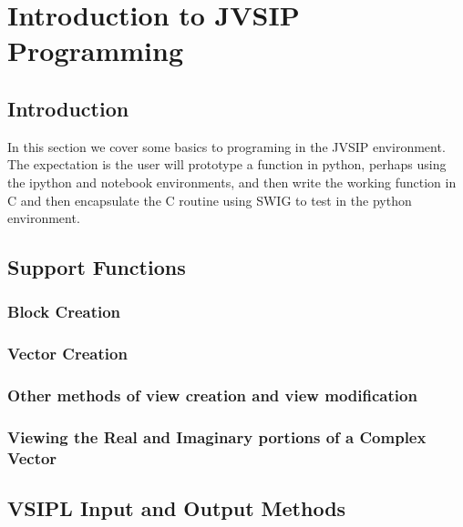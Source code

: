 \chapter{Introduction to JVSIP Programming}
\section*{Introduction}
In this section we cover some basics to programing in the JVSIP environment. The expectation is the user will
prototype a function in python, perhaps using the ipython and notebook environments, and then write the
working function in C and then encapsulate the C routine using SWIG to test in the python environment.
\section*{Support Functions}
\subsection*{Block Creation}
\subsection*{Vector Creation}
\subsection*{Other methods of view creation and view modification}
\subsection*{Viewing the Real and Imaginary portions of a Complex Vector}
\section*{VSIPL Input and Output Methods}
